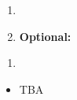 \documentclass{article}
\begin{document}
\dia{}
\begin{enumerate}
\item {}
\item[ ] \textbf{Optional:} 
\end{enumerate}


\dia{}
\begin{enumerate}
\item {}
\end{enumerate}

\dia{} 
\begin{itemize}
\item TBA
\end{itemize}

\week{}
\dia{}
\Review{}
\end{document}
